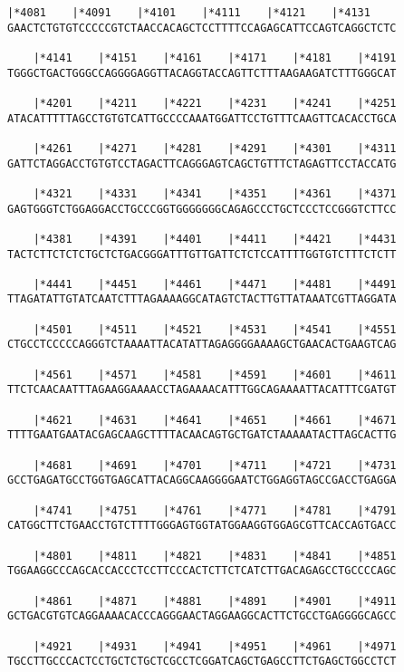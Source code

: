 \documentclass{article}
\begin{document}
\begin{Verbatim}[fontfamily=courier]
    |*4081    |*4091    |*4101    |*4111    |*4121    |*4131
GAACTCTGTGTCCCCCGTCTAACCACAGCTCCTTTTCCAGAGCATTCCAGTCAGGCTCTC

    |*4141    |*4151    |*4161    |*4171    |*4181    |*4191
TGGGCTGACTGGGCCAGGGGAGGTTACAGGTACCAGTTCTTTAAGAAGATCTTTGGGCAT

    |*4201    |*4211    |*4221    |*4231    |*4241    |*4251
ATACATTTTTAGCCTGTGTCATTGCCCCAAATGGATTCCTGTTTCAAGTTCACACCTGCA

    |*4261    |*4271    |*4281    |*4291    |*4301    |*4311
GATTCTAGGACCTGTGTCCTAGACTTCAGGGAGTCAGCTGTTTCTAGAGTTCCTACCATG

    |*4321    |*4331    |*4341    |*4351    |*4361    |*4371
GAGTGGGTCTGGAGGACCTGCCCGGTGGGGGGGCAGAGCCCTGCTCCCTCCGGGTCTTCC

    |*4381    |*4391    |*4401    |*4411    |*4421    |*4431
TACTCTTCTCTCTGCTCTGACGGGATTTGTTGATTCTCTCCATTTTGGTGTCTTTCTCTT

    |*4441    |*4451    |*4461    |*4471    |*4481    |*4491
TTAGATATTGTATCAATCTTTAGAAAAGGCATAGTCTACTTGTTATAAATCGTTAGGATA

    |*4501    |*4511    |*4521    |*4531    |*4541    |*4551
CTGCCTCCCCCAGGGTCTAAAATTACATATTAGAGGGGAAAAGCTGAACACTGAAGTCAG

    |*4561    |*4571    |*4581    |*4591    |*4601    |*4611
TTCTCAACAATTTAGAAGGAAAACCTAGAAAACATTTGGCAGAAAATTACATTTCGATGT

    |*4621    |*4631    |*4641    |*4651    |*4661    |*4671
TTTTGAATGAATACGAGCAAGCTTTTACAACAGTGCTGATCTAAAAATACTTAGCACTTG

    |*4681    |*4691    |*4701    |*4711    |*4721    |*4731
GCCTGAGATGCCTGGTGAGCATTACAGGCAAGGGGAATCTGGAGGTAGCCGACCTGAGGA

    |*4741    |*4751    |*4761    |*4771    |*4781    |*4791
CATGGCTTCTGAACCTGTCTTTTGGGAGTGGTATGGAAGGTGGAGCGTTCACCAGTGACC

    |*4801    |*4811    |*4821    |*4831    |*4841    |*4851
TGGAAGGCCCAGCACCACCCTCCTTCCCACTCTTCTCATCTTGACAGAGCCTGCCCCAGC

    |*4861    |*4871    |*4881    |*4891    |*4901    |*4911
GCTGACGTGTCAGGAAAACACCCAGGGAACTAGGAAGGCACTTCTGCCTGAGGGGCAGCC

    |*4921    |*4931    |*4941    |*4951    |*4961    |*4971
TGCCTTGCCCACTCCTGCTCTGCTCGCCTCGGATCAGCTGAGCCTTCTGAGCTGGCCTCT

\end{Verbatim}
\newpage
\end{document}
